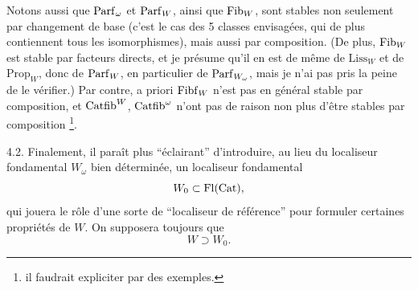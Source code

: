 Notons aussi que $\mathrm{Parf}_\omega$ et $\mathrm{Parf}_W$, ainsi que $\mathrm{Fib}_W$, sont stables non seulement par changement de base (c'est le cas des 5 classes envisagées, qui de plus contiennent tous les isomorphismes), mais aussi par composition. (De plus, $\mathrm{Fib}_W$ est stable par facteurs directs, et je présume qu'il en est de même de $\mathrm{Liss}_W$ et de $\mathrm{Prop}_W$, donc de $\mathrm{Parf}_W$, en particulier de $\mathrm{Parf}_{W_\omega}$, mais je n'ai pas pris la peine de le vérifier.) Par contre, a priori $\mathrm{Fibf}_W$ n'est pas en général stable par composition, et $\mathrm{Catfib}^W$, $\mathrm{Catfib}^\omega$ n'ont pas de raison
non plus d'être stables par composition \footnote[22]{il faudrait expliciter par des exemples.}.

4.2. Finalement, il paraît plus “éclairant” d'introduire, au lieu du localiseur fondamental $W_\omega$ bien déterminée, un localiseur fondamental %
\[
W_0 \subset \mathrm{Fl}(\mathrm{Cat}),
\]
qui jouera le rôle d'une sorte de “localiseur de référence” pour formuler certaines propriétés de $W$. On supposera toujours que
\[
W \supset W_0.
\]


